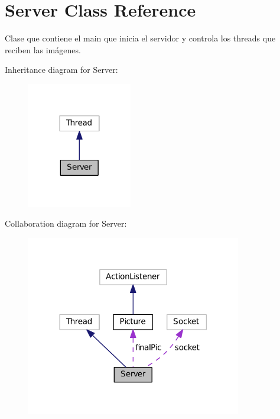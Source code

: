 \hypertarget{class_server}{}\section{Server Class Reference}
\label{class_server}


Clase que contiene el main que inicia el servidor y controla los threads que reciben las imágenes.  




Inheritance diagram for Server\+:
\nopagebreak
\begin{figure}[H]
\begin{center}
\leavevmode
\includegraphics[width=130pt]{class_server__inherit__graph}
\end{center}
\end{figure}


Collaboration diagram for Server\+:
\nopagebreak
\begin{figure}[H]
\begin{center}
\leavevmode
\includegraphics[width=266pt]{class_server__coll__graph}
\end{center}
\end{figure}
